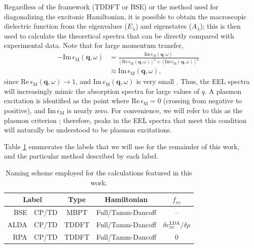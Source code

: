 \documentclass[aps,prb,10pt,showpacs,superscriptaddress,twocolumn,notitlepage]{revtex4-1}
\begin{document}
Regardless of the framework (TDDFT or BSE) or the method used for diagonalizing
the excitonic Hamiltonian, it is possible to obtain the macroscopic dielectric
function from the eigenvalues ($E_{\lambda}$) and eigenstates ($A_{\lambda}$);
\cite{onidaRMP02} this is then used to calculate the theoretical spectra that
can be directly compared with experimental data. Note that for large momentum
transfer,
\begin{equation}\label{eq:eels}
\begin{split}
-\mathrm{Im}\,\epsilon_{\mathrm{M}}(\mathbf{q}, \omega)
&= \frac{\mathrm{Im}\,\epsilon_{\mathrm{M}}(\mathbf{q}, \omega)}
        {[\mathrm{Re}\,\epsilon_{\mathrm{M}}(\mathbf{q}, \omega)]^{2} +
         [\mathrm{Im}\,\epsilon_{\mathrm{M}}(\mathbf{q}, \omega)]^{2}}\\
&\approx \mathrm{Im}\,\epsilon_{\mathrm{M}}(\mathbf{q}, \omega),
\end{split}
\end{equation}
since $\mathrm{Re}\,\epsilon_{\mathrm{M}}(\mathbf{q}, \omega) \rightarrow 1$,
and $\mathrm{Im}\,\epsilon_{\mathrm{M}}(\mathbf{q}, \omega)$ is very small
\cite{gattiPRB13}. Thus, the EEL spectra will increasingly mimic the absorption
spectra for large values of $q$. A plasmon excitation is identified as the point
where $\mathrm{Re}\,\epsilon_{\mathrm{M}} = 0$ (crossing from negative to
positive), and $\mathrm{Im}\,\epsilon_{\mathrm{M}}$ is nearly zero. For
convenience, we will refer to this as the plasmon criterion
\cite{jonesbookv11973}; therefore, peaks in the EEL spectra that meet this
condition will naturally be understood to be plasmon excitations.

Table \ref{tab:names} enumerates the labels that we will use for the remainder
of this work, and the particular method described by each label.

\begin{table}[b]
\caption{Naming scheme employed for the calculations featured in this work.}
\label{tab:names}
\begin{ruledtabular}
\begin{tabular}{ r l c c c }
\multicolumn{2}{c}{Label}  & Type   & Hamiltonian  & $f_{xc}$ \\
\hline
BSE  & CP/TD & MBPT  & Full/Tamm-Dancoff & -- \\
ALDA & CP/TD & TDDFT & Full/Tamm-Dancoff & $\delta v^{\mathrm{LDA}}_{xc}/\delta\rho$ \\
RPA  & CP/TD & TDDFT & Full/Tamm-Dancoff & $0$
\end{tabular}
\end{ruledtabular}
\end{table}
\end{document}
